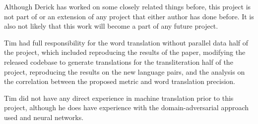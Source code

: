 \documentclass{article}
\begin{document}
Although Derick has worked on some closely related things before,
this project is not part of or an extension of any project
that either author has done before.
It is also not likely that this work will become a part of any future project.

Tim had full responsibility for the word translation without parallel data
half of the project, which included reproducing the results of the paper,
modifying the released codebase to generate translations for the
transliteration half of the project, reproducing the results on the new
language pairs, and the analysis on the correlation between the proposed
metric and word translation precision.

Tim did not have any direct experience in machine translation prior to this
project, although he does have experience with the domain-adversarial
approach used and neural networks.

{}

\end{document}
